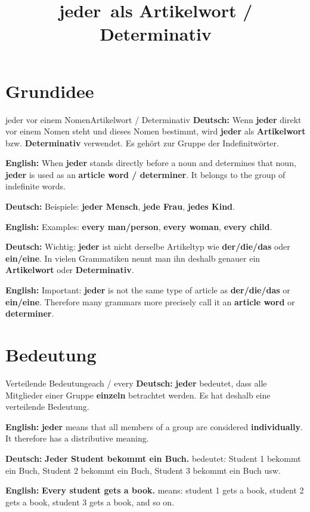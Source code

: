 \documentclass[a4paper,11pt]{article}
\title{\glqq jeder\grqq\ als Artikelwort / Determinativ}
\date{}
\newcommand{\GermanText}[1]{\textbf{Deutsch: }#1\par}
\newcommand{\EnglishText}[1]{{\small\color{SoftGray}\textbf{English: }#1\par}}
\begin{document}
\maketitle
\tableofcontents
\newpage

\section{Grundidee}
\begin{grammarentry}{jeder vor einem Nomen}{Artikelwort / Determinativ}
\GermanText{Wenn \textbf{jeder} direkt vor einem Nomen steht und dieses Nomen bestimmt, wird \textbf{jeder} als \textbf{Artikelwort} bzw. \textbf{Determinativ} verwendet. Es gehört zur Gruppe der Indefinitwörter.}
\EnglishText{When \textbf{jeder} stands directly before a noun and determines that noun, \textbf{jeder} is used as an \textbf{article word / determiner}. It belongs to the group of indefinite words.}
\GermanText{Beispiele: \textbf{jeder Mensch}, \textbf{jede Frau}, \textbf{jedes Kind}.}
\EnglishText{Examples: \textbf{every man/person}, \textbf{every woman}, \textbf{every child}.}
\GermanText{Wichtig: \textbf{jeder} ist nicht derselbe Artikeltyp wie \textbf{der/die/das} oder \textbf{ein/eine}. In vielen Grammatiken nennt man ihn deshalb genauer ein \textbf{Artikelwort} oder \textbf{Determinativ}.}
\EnglishText{Important: \textbf{jeder} is not the same type of article as \textbf{der/die/das} or \textbf{ein/eine}. Therefore many grammars more precisely call it an \textbf{article word} or \textbf{determiner}.}
\end{grammarentry}

\section{Bedeutung}
\begin{grammarentry}{Verteilende Bedeutung}{each / every}
\GermanText{\textbf{jeder} bedeutet, dass alle Mitglieder einer Gruppe \textbf{einzeln} betrachtet werden. Es hat deshalb eine verteilende Bedeutung.}
\EnglishText{\textbf{jeder} means that all members of a group are considered \textbf{individually}. It therefore has a distributive meaning.}
\GermanText{\textbf{Jeder Student bekommt ein Buch.} bedeutet: Student 1 bekommt ein Buch, Student 2 bekommt ein Buch, Student 3 bekommt ein Buch usw.}
\EnglishText{\textbf{Every student gets a book.} means: student 1 gets a book, student 2 gets a book, student 3 gets a book, and so on.}
\end{grammarentry}
\end{document}
